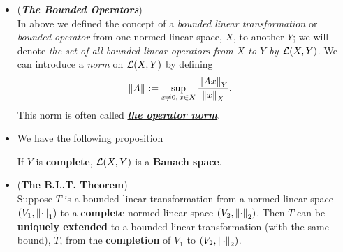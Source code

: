 \documentclass[11pt]{article}
\begin{document}
\begin{itemize}
\item \begin{definition}(\emph{\textbf{The Bounded Operators}})\\
In above we defined the concept of a \emph{bounded linear transformation} or \emph{bounded operator} from one normed linear space, $X$, to another $Y$; we will denote \emph{the set of all bounded linear operators from $X$ to $Y$ by ${\mathcal L}(X, Y)$}. We can introduce a \emph{norm} on  ${\mathcal L}(X, Y)$ by defining
\begin{align*}
\left\|A\right\|_{} &:= \sup_{x \neq 0, \, x \in X} \frac{\left\|Ax\right\|_{Y}}{\left\|x\right\|_{X}}.
\end{align*}
This norm is often called \underline{\emph{\textbf{the operator norm}}}.
\end{definition}

\item We have the following proposition
\begin{proposition} \label{prop: bounded_operator_banach}
If $Y$ is \textbf{complete}, ${\mathcal L}(X, Y)$ is a \textbf{Banach space}.
\end{proposition}

\item \begin{theorem} (\textbf{The B.L.T. Theorem}) \citep{reed1980methods}\\
Suppose $T$ is a bounded linear transformation from a normed linear space $(V_1, \left\|\cdot\right\|_{1})$ to a \textbf{complete} normed linear space $(V_2, \left\|\cdot\right\|_{2})$. Then $T$ can be \textbf{uniquely extended} to a bounded linear transformation (with the same bound), $\widetilde{T}$, from the \textbf{completion} of $V_1$ to $(V_2, \left\|\cdot\right\|_{2})$.
\end{theorem}
\end{itemize}
\end{document}
